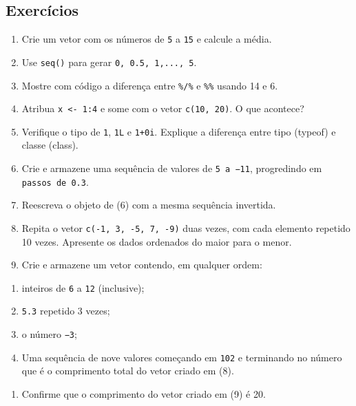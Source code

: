 \documentclass[
  letterpaper,
  DIV=11,
  numbers=noendperiod]{scrreprt}
\providecommand{\tightlist}{%
  \setlength{\itemsep}{0pt}\setlength{\parskip}{0pt}}\usepackage{longtable,booktabs,array}
\begin{document}
\subsection*{Exercícios}\label{exercuxedcios}

\begin{enumerate}
\def\labelenumi{\arabic{enumi}.}
\item
  Crie um vetor com os números de \texttt{5} a \texttt{15} e calcule a
  média.
\item
  Use \texttt{seq()} para gerar \texttt{0,\ 0.5,\ 1,...,\ 5}.
\item
  Mostre com código a diferença entre \texttt{\%/\%} e \texttt{\%\%}
  usando 14 e 6.
\item
  Atribua \texttt{x\ \textless{}-\ 1:4} e some com o vetor
  \texttt{c(10,\ 20)}. O que acontece?
\item
  Verifique o tipo de \texttt{1}, \texttt{1L} e \texttt{1+0i}. Explique
  a diferença entre tipo (typeof) e classe (class).
\item
  Crie e armazene uma sequência de valores de \texttt{5\ a\ −11},
  progredindo em \texttt{passos\ de\ 0.3}.
\item
  Reescreva o objeto de (6) com a mesma sequência invertida.
\item
  Repita o vetor \texttt{c(-1,\ 3,\ -5,\ 7,\ -9)} duas vezes, com cada
  elemento repetido 10 vezes. Apresente os dados ordenados do maior para
  o menor.
\item
  Crie e armazene um vetor contendo, em qualquer ordem:
\end{enumerate}

\begin{enumerate}
\def\labelenumi{\alph{enumi})}
\item
  inteiros de \texttt{6} a \texttt{12} (inclusive);
\item
  \texttt{5.3} repetido 3 vezes;
\item
  o número \texttt{−3};
\item
  Uma sequência de nove valores começando em \texttt{102} e terminando
  no número que é o comprimento total do vetor criado em (8).
\end{enumerate}

\begin{enumerate}
\def\labelenumi{\arabic{enumi}.}
\setcounter{enumi}{9}
\tightlist
\item
  Confirme que o comprimento do vetor criado em (9) é 20.
\end{enumerate}
\end{document}
